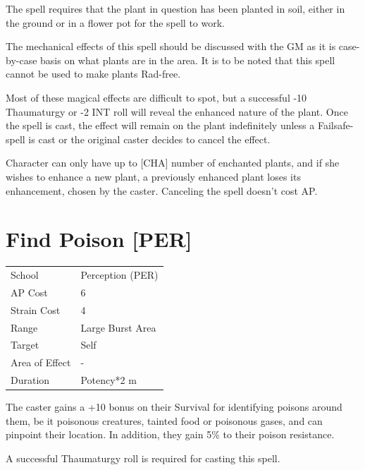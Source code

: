 \documentclass[11pt,a4paper,twocolumn]{book}
\begin{document}
The spell requires that the plant in question has been planted in soil, either in the ground or in a flower pot for the spell to work.

The mechanical effects of this spell should be discussed with the GM as it is case-by-case basis on what plants are in the area. It is to be noted that this spell cannot be used to make plants Rad-free.

Most of these magical effects are difficult to spot, but a successful -10 Thaumaturgy or -2 INT roll will reveal the enhanced nature of the plant.
Once the spell is cast, the effect will remain on the plant indefinitely unless a Failsafe-spell is cast or the original caster decides to cancel the effect.

Character can only have up to [CHA] number of enchanted plants, and if she wishes to enhance a new plant, a previously enhanced plant loses its enhancement, chosen by the caster. Canceling the spell doesn't cost AP.


\section*{Find Poison [PER]}
{
	\begin{tabu} to 75mm{| X[l,4] | X[l,7] |}
		\hline
		School 			& Perception (PER) 	\\
        AP Cost	      	& 6 				\\
        Strain Cost     & 4 				\\
        Range     		& Large Burst Area 	\\
        Target      	& Self 				\\
        Area of Effect  & - 	 			\\
        Duration     	& Potency*2 m 		\\ \hline
	\end{tabu}
		
}

\medskip

The caster gains a +10 bonus on their Survival for identifying poisons around them, be it poisonous creatures, tainted food or poisonous gases, and can pinpoint their location. In addition, they gain 5\% to their poison resistance.

A successful Thaumaturgy roll is required for casting this spell.
\end{document}
